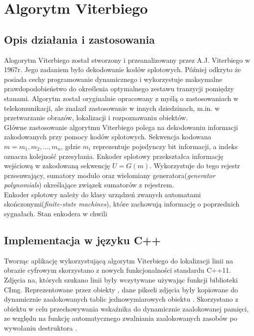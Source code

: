\documentclass[document.tex]{subfiles}
\begin{document}
\chapter{Algorytm Viterbiego}
\section{Opis działania i zastosowania}
\indent Alogorytm Viterbiego został stworzony i przeanalizowany przez A.J. Viterbiego w 1967r. Jego zadaniem było dekodowanie kodów splotowych. Później odkryto że posiada cechy programowanie dynamicznego i wykorzystuje maksymalne prawdopodobieństwo do określenia optymalnego zestawu tranzycji pomiędzy stanami. Algorytm został oryginalnie opracowany z myślą o zastosowaniach w telekomunikacji, ale znalazł zastosowanie w innych dziedzinach, m.in. w przetwarzanie obrazów, lokalizacji i rozpoznawaniu obiektów.
\\
\indent Główne zastosowanie algorytmu Viterbiego polega na
dekodowaniu informacji zakodowanych przy pomocy kodów splotowych. Sekwencja kodowana $m = m_1, m_2,...,m_n$, gdzie 
$m_i$ reprezentuje pojedynczy bit informacji, a indeks oznacza kolejność przesyłania. Enkoder splotowy przekształca informację wejściową w zakodowaną sekwencję $U = G(m)$.
Wykorzystuje do tego rejestr przesuwający, sumatory modulo oraz wielomiany generatora(\textit{generator polynomials}) określające związek sumatorów z rejestrem. 
\\
\indent Enkoder splotowy należy do klasy urządzeń zwanych automatami skończonymi(\textit{finite-state machines}), które zachowują informację o poprzednich sygnałach.
Stan enkodera w chwili %



\section{Implementacja w języku C++}
\indent Tworząc aplikację wykorzystującą algorytm Viterbiego do lokalizacji linii
na obrazie cyfrowym skorzystano z nowych funkcjonalności standardu C++11. 
Zdjęcia na, których szukano linii były wczytywane używając funkcji biblioteki
CImg. Reprezentowane przez obiekty , dane pikseli zdjęcia były kopiowane do
dynamicznie zaalokowanych tablic jednowymiarowych obiektu . Skorzystano z obiektu  w celu przechowywania wskaźnika do dynamicznie zaalokowanej pamięci, ze względu na funkcję automatycznego zwalniania zaalokowanych zasobów po wywołaniu destruktora .  
\end{document}
